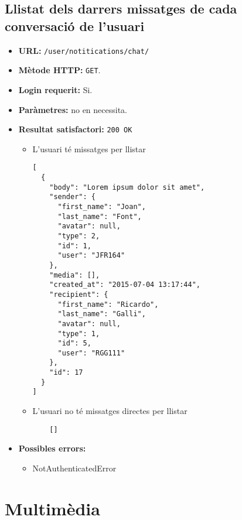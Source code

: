 \subsection{Llistat dels darrers missatges de cada conversació de l'usuari}
\begin{itemize}
\item \textbf{\ac{URL}:} \texttt{/user/notitications/chat/}
\item \textbf{Mètode \ac{HTTP}: } \texttt{GET}.
\item \textbf{Login requerit:} Si.
\item \textbf{Paràmetres:} no en necessita.

\item \textbf{Resultat satisfactori:} \texttt{200 OK}
	\begin{itemize}
		\item L'usuari té missatges per llistar
	\begin{verbatim}
[
  {
    "body": "Lorem ipsum dolor sit amet",
    "sender": {
      "first_name": "Joan",
      "last_name": "Font",
      "avatar": null,
      "type": 2,
      "id": 1,
      "user": "JFR164"
    },
    "media": [],
    "created_at": "2015-07-04 13:17:44",
    "recipient": {
      "first_name": "Ricardo",
      "last_name": "Galli",
      "avatar": null,
      "type": 1,
      "id": 5,
      "user": "RGG111"
    },
    "id": 17
  }
]
	\end{verbatim}
	
	\item L'usuari no té missatges directes per llistar
	
	\begin{verbatim}
	[]
	\end{verbatim}
	
	\end{itemize}


\item \textbf{Possibles errors:}
	\begin{itemize}
		\item NotAuthenticatedError
	\end{itemize}
\end{itemize}


\section{Multimèdia}

